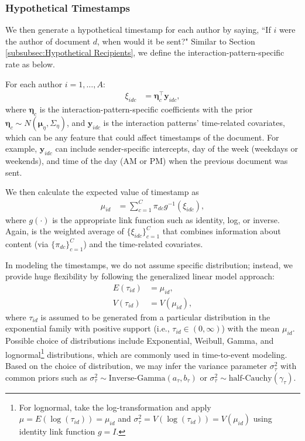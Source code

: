 \documentclass{article}
\begin{document}
\subsubsection{Hypothetical Timestamps}\label{subsubsec:Hypothetical Timestamps}
We then generate a hypothetical timestamp for each author by saying, ``If $i$ were the author of document $d$, when would it be sent?" Similar to Section \ref{subsubsec:Hypothetical Recipients}, we define the interaction-pattern-specific rate as below.

For each author $i =1,\ldots,A$:
\begin{align*}
\xi_{idc}& = \boldsymbol{\eta}_c^\top \boldsymbol{y}_{idc},
\end{align*}
where $\boldsymbol{\eta}_c$ is the interaction-pattern-specific coefficients with the prior $\boldsymbol{\eta}_c \sim N(\boldsymbol{\mu}_\eta,\Sigma_\eta)$, and $\boldsymbol{y}_{idc}$ is the interaction patterns' time-related covariates, which can be any feature that could affect timestamps of the document. For example, $\boldsymbol{y}_{idc}$ can include sender-specific intercepts, day of the week (weekdays or weekends), and time of the day (AM or PM) when the previous document was sent.

We then calculate the expected value of timestamp as
\begin{align*}\mu_{id} &= \sum_{c=1}^C \pi_{dc} g^{-1}(\xi_{idc}),
\end{align*}
where $g(\cdot)$ is the appropriate link function such as identity, log, or inverse. Again, is the weighted average of $\{\xi_{idc}\}_{c=1}^C$ that combines information about content (via $\{\pi_{dc}\}_{c=1}^C$) and the time-related covariates.

In modeling the timestamps, we do not assume specific distribution; instead, we provide huge flexibility by following the generalized linear model approach:
\begin{align*}
E(\tau_{id}) &= \mu_{id},\\
V(\tau_{id}) &= V(\mu_{id}),
\end{align*}
where $\tau_{id}$ is assumed to be generated from a particular distribution in the exponential family with positive support (i.e., $\tau_{id} \in (0, \infty)$) with the mean $\mu_{id}$. Possible choice of distributions include Exponential, Weibull, Gamma, and lognormal\footnote{For lognormal, take the log-transformation and apply $\mu = E(\log(\tau_{id})) = \mu_{id}$ and $ \sigma_\tau^2=V(\log(\tau_{id})) = V(\mu_{id})$ using identity link function $g = I$.} distributions, which are commonly used in time-to-event modeling. Based on the choice of distribution, we may infer the variance parameter $\sigma_\tau^2$ with common priors such as $\sigma_\tau^2 \sim \mbox{Inverse-Gamma}(a_\tau, b_\tau)$ or $\sigma_\tau^2 \sim \mbox{half-Cauchy}(\gamma_\tau)$.
\end{document}
